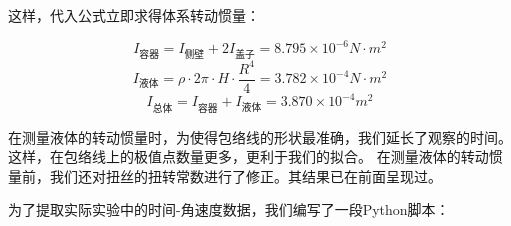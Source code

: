 \documentclass[12pt,hyperref,a4paper,UTF8]{ctexart}
\begin{document}
\begin{table}[h!]
\centering
{}
\caption{实验体系的静态测量数据}
\end{table}

这样，代入公式立即求得体系转动惯量：

$$ I_{容器} = I_{侧壁} + 2I_{盖子} = 8.795 \times 10^{-6} N·m^2 $$
$$ I_{液体} = \rho · 2\pi · H · \frac{R^4}{4}
           = 3.782 \times 10^{-4} N·m^2 $$
$$ I_{总体} = I_{容器} + I_{液体} = 3.870 \times 10^{-4} m^2 $$

在测量液体的转动惯量时，为使得包络线的形状最准确，我们延长了观察的时间。这样，在包络线上的极值点数量更多，更利于我们的拟合。
在测量液体的转动惯量前，我们还对扭丝的扭转常数进行了修正。其结果已在前面呈现过。

为了提取实际实验中的时间-角速度数据，我们编写了一段Python脚本：
\end{document}
